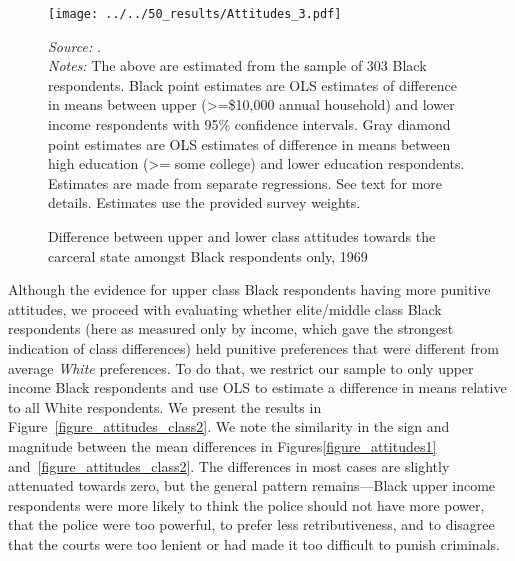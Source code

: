 \documentclass[12pt]{article}
\begin{document}
\begin{figure}[h!]
 \begin{center}
 \caption{Difference between upper and lower class attitudes towards the carceral state amongst Black respondents only, 1969}
 \small
		 \texttt{[image: ../../50\_results/Attitudes\_3.pdf]}
 \label{figure_attitudes2}
 	\end{center}
 	{\scriptsize{\emph{Source:} \cite{Violence1969}. }} \\
	{\scriptsize{\emph{Notes:} The above are estimated from the sample of 303 Black respondents.  Black point estimates are OLS estimates of difference in means between upper (>=\$10,000 annual household) and lower income respondents with 95\% confidence intervals. Gray diamond point estimates are OLS estimates of difference in means between high education (>= some college) and lower education respondents.  Estimates are made from separate regressions.  See text for more details.  Estimates use the provided survey weights.  \singlespacing }}
\end{figure} \normalsize

Although the evidence for upper class Black respondents having more punitive attitudes, we proceed with evaluating whether elite/middle class Black respondents (here as measured only by income, which gave the strongest indication of class differences) held punitive preferences that were different from average \emph{White} preferences.  To do that, we restrict our sample to only upper income Black respondents and use OLS to estimate a difference in means relative to all White respondents.  We present the results in Figure~\ref{figure_attitudes_class2}.  We note the similarity in the sign and magnitude between the mean differences in Figures\ref{figure_attitudes1} and~\ref{figure_attitudes_class2}.  The differences in most cases are slightly attenuated towards zero, but the general pattern remains---Black upper income respondents were more likely to think the police should not have more power, that the police were too powerful, to prefer less retributiveness, and to disagree that the courts were too lenient or had made it too difficult to punish criminals.
\end{document}
